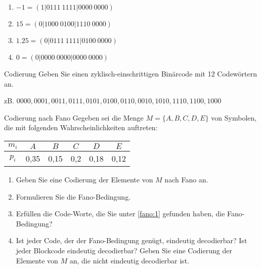 \documentclass{article}
\begin{document}
\begin{solution}
  \begin{enumerate}
    \item $-1 = (1|0111\ 1111|0000\ 0000)$
    \item $15 = (0|1000\ 0100|1110\ 0000)$
    \item $1.25 = (0|0111\ 1111|0100\ 0000)$
    \item $0 = (0|0000\ 0000|0000\ 0000)$
  \end{enumerate}
\end{solution}

\begin{exercise}{Codierung}
  Geben Sie einen zyklisch-einschrittigen Binärcode mit 12 Codewörtern an.\points[5]

  \begin{solution}
    zB. $0000, 0001, 0011, 0111, 0101, 0100, 0110, 0010, 1010, 1110, 1100, 1000$
  \end{solution}
\end{exercise}

\begin{exercise}{Codierung nach Fano}
  Gegeben sei die Menge $M = \{A, B, C, D, E\}$ von Symbolen, die mit folgenden Wahrscheinlichkeiten auftreten:
  \centering\begin{tabular}{c|ccccc}
    $m_i$ & $A$  & $B$  & $C$ & $D$  & $E$  \\
    \hline
    $p_i$ & 0,35 & 0,15 & 0,2 & 0,18 & 0,12 \\
  \end{tabular}
  \begin{enumerate}
    \item\label{fano:1} Geben Sie eine Codierung der Elemente von $M$ nach Fano an.\points[7]
    \item Formulieren Sie die Fano-Bedingung.\points
    \item Erfüllen die Code-Worte, die Sie unter \ref{fano:1} gefunden haben, die Fano-Bedingung?\points
    \item Ist jeder Code, der der Fano-Bedingung genügt, eindeutig decodierbar? Ist jeder Blockcode eindeutig decodierbar? Geben Sie eine Codierung der Elemente von $M$ an, die nicht eindeutig decodierbar ist.\points[3]
  \end{enumerate}
\end{exercise}
\end{document}
